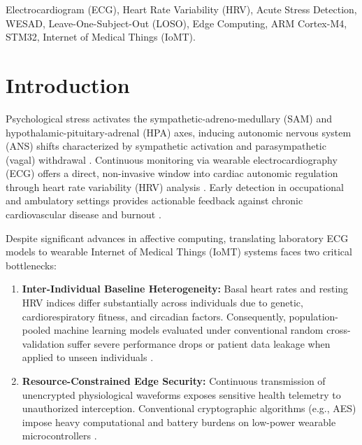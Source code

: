 \documentclass[conference]{IEEEtran}
\begin{document}
\begin{IEEEkeywords}
Electrocardiogram (ECG), Heart Rate Variability (HRV), Acute Stress Detection, WESAD, Leave-One-Subject-Out (LOSO), Edge Computing, ARM Cortex-M4, STM32, Internet of Medical Things (IoMT).
\end{IEEEkeywords}

\section{Introduction}
Psychological stress activates the sympathetic-adreno-medullary (SAM) and hypothalamic-pituitary-adrenal (HPA) axes, inducing autonomic nervous system (ANS) shifts characterized by sympathetic activation and parasympathetic (vagal) withdrawal \cite{kirschbaum1993trier, kim2018stress}. Continuous monitoring via wearable electrocardiography (ECG) offers a direct, non-invasive window into cardiac autonomic regulation through heart rate variability (HRV) analysis \cite{taskforce1996hrv, shaffer2017overview}. Early detection in occupational and ambulatory settings provides actionable feedback against chronic cardiovascular disease and burnout \cite{healey2005detecting, can2019continuous}.

Despite significant advances in affective computing, translating laboratory ECG models to wearable Internet of Medical Things (IoMT) systems \cite{alturjman2020iomt, jiang2023wban} faces two critical bottlenecks:
\begin{enumerate}
    \item \textbf{Inter-Individual Baseline Heterogeneity:} Basal heart rates and resting HRV indices differ substantially across individuals due to genetic, cardiorespiratory fitness, and circadian factors. Consequently, population-pooled machine learning models evaluated under conventional random cross-validation suffer severe performance drops or patient data leakage when applied to unseen individuals \cite{saeb2017need, schmidt2018wesad, plarre2011continuous}.
    \item \textbf{Resource-Constrained Edge Security:} Continuous transmission of unencrypted physiological waveforms exposes sensitive health telemetry to unauthorized interception. Conventional cryptographic algorithms (e.g., AES) impose heavy computational and battery burdens on low-power wearable microcontrollers \cite{fotiadis2020wearable}.
\end{enumerate}
\end{document}

